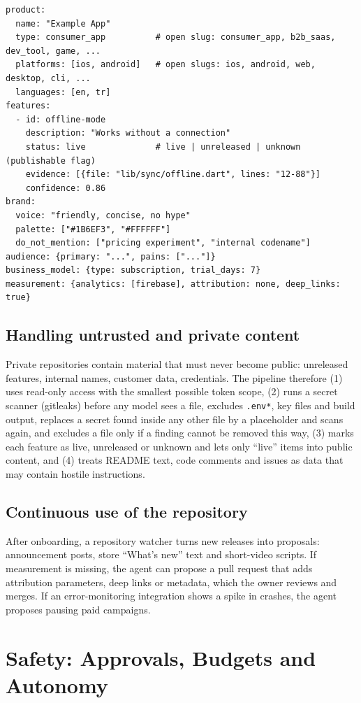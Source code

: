 \documentclass[11pt,a4paper]{article}
\begin{document}
\begin{lstlisting}
product:
  name: "Example App"
  type: consumer_app          # open slug: consumer_app, b2b_saas, dev_tool, game, ...
  platforms: [ios, android]   # open slugs: ios, android, web, desktop, cli, ...
  languages: [en, tr]
features:
  - id: offline-mode
    description: "Works without a connection"
    status: live              # live | unreleased | unknown  (publishable flag)
    evidence: [{file: "lib/sync/offline.dart", lines: "12-88"}]
    confidence: 0.86
brand:
  voice: "friendly, concise, no hype"
  palette: ["#1B6EF3", "#FFFFFF"]
  do_not_mention: ["pricing experiment", "internal codename"]
audience: {primary: "...", pains: ["..."]}
business_model: {type: subscription, trial_days: 7}
measurement: {analytics: [firebase], attribution: none, deep_links: true}
\end{lstlisting}

\subsection{Handling untrusted and private content}
Private repositories contain material that must never become public: unreleased features, internal names, customer data, credentials. The pipeline therefore (1) uses read-only access with the smallest possible token scope, (2) runs a secret scanner (gitleaks) before any model sees a file, excludes \texttt{.env*}, key files and build output, replaces a secret found inside any other file by a placeholder and scans again, and excludes a file only if a finding cannot be removed this way, (3) marks each feature as live, unreleased or unknown and lets only ``live'' items into public content, and (4) treats README text, code comments and issues as data that may contain hostile instructions.

\subsection{Continuous use of the repository}
After onboarding, a repository watcher turns new releases into proposals: announcement posts, store ``What's new'' text and short-video scripts. If measurement is missing, the agent can propose a pull request that adds attribution parameters, deep links or metadata, which the owner reviews and merges. If an error-monitoring integration shows a spike in crashes, the agent proposes pausing paid campaigns.

\section{Safety: Approvals, Budgets and Autonomy}\label{sec:safety}
\end{document}
